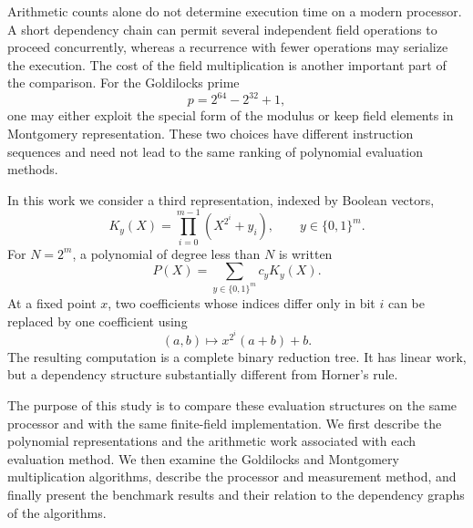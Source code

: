 \documentclass[11pt]{article}
\begin{document}
Arithmetic counts alone do not determine execution time on a modern
processor.  A short dependency chain can permit several independent field
operations to proceed concurrently, whereas a recurrence with fewer
operations may serialize the execution.  The cost of the field
multiplication is another important part of the comparison.  For the
Goldilocks prime
\[
p=2^{64}-2^{32}+1,
\]
one may either exploit the special form of the modulus or keep field
elements in Montgomery representation.  These two choices have different
instruction sequences and need not lead to the same ranking of polynomial
evaluation methods.

In this work we consider a third representation, indexed by Boolean
vectors,
\[
K_y(X)=\prod_{i=0}^{m-1}\left(X^{2^i}+y_i\right),
\qquad
y\in\{0,1\}^m .
\]
For \(N=2^m\), a polynomial of degree less than \(N\) is written
\[
P(X)=\sum_{y\in\{0,1\}^m}c_yK_y(X).
\]
At a fixed point \(x\), two coefficients whose indices differ only in bit
\(i\) can be replaced by one coefficient using
\[
(a,b)\longmapsto x^{2^i}(a+b)+b.
\]
The resulting computation is a complete binary reduction tree.  It has
linear work, but a dependency structure substantially different from
Horner's rule.

The purpose of this study is to compare these evaluation structures on the
same processor and with the same finite-field implementation.  We first
describe the polynomial representations and the arithmetic work associated
with each evaluation method.  We then examine the Goldilocks and Montgomery
multiplication algorithms, describe the processor and measurement method,
and finally present the benchmark results and their relation to the
dependency graphs of the algorithms.









\end{document}

